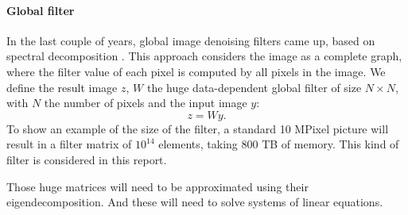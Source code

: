 \paragraph{Global filter}
In the last couple of years, global image denoising filters came up, based on spectral decomposition \cite{glide_2014}.
This approach considers the image as a complete graph, where the filter value of each pixel is computed by all pixels in the image.
We define the result image \(z\), \(W\) the huge data-dependent global filter of size \(N \times N\), with \(N\) the number of pixels and the input image \(y\):
\[z = Wy.\]
To show an example of the size of the filter, a standard 10 MPixel picture will result in a filter matrix of \(10^{14}\) elements, taking 800 TB of memory.
This kind of filter is considered in this report.

Those huge matrices will need to be approximated using their eigendecomposition.
And these will need to solve systems of linear equations.

